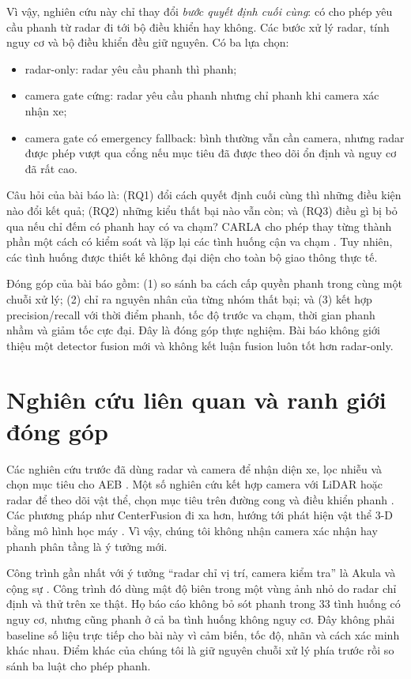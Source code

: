 \documentclass[conference]{IEEEtran}
\begin{document}
Vì vậy, nghiên cứu này chỉ thay đổi \emph{bước quyết định cuối cùng}: có cho
phép yêu cầu phanh từ radar đi tới bộ điều khiển hay không. Các bước xử lý
radar, tính nguy cơ và bộ điều khiển đều giữ nguyên. Có ba lựa chọn:

\begin{itemize}
\item radar-only: radar yêu cầu phanh thì phanh;
\item camera gate cứng: radar yêu cầu phanh nhưng chỉ phanh khi camera xác nhận
xe;
\item camera gate có emergency fallback: bình thường vẫn cần camera, nhưng
radar được phép vượt qua cổng nếu mục tiêu đã được theo dõi ổn định và nguy cơ
đã rất cao.
\end{itemize}

Câu hỏi của bài báo là: (RQ1) đổi cách quyết định cuối cùng thì những điều kiện
nào đổi kết quả; (RQ2) những kiểu thất bại nào vẫn còn; và (RQ3) điều gì bị bỏ
qua nếu chỉ đếm có phanh hay có va chạm? CARLA cho phép thay từng thành phần
một cách có kiểm soát và lặp lại các tình huống cận va chạm
\cite{dosovitskiy2017carla,kang2019testing}. Tuy nhiên, các tình huống được
thiết kế không đại diện cho toàn bộ giao thông thực tế.

Đóng góp của bài báo gồm: (1) so sánh ba cách cấp quyền phanh trong cùng một
chuỗi xử lý; (2) chỉ ra nguyên nhân của từng nhóm thất bại; và (3) kết hợp
precision/recall với thời điểm phanh, tốc độ trước va chạm, thời gian phanh
nhầm và giảm tốc cực đại. Đây là đóng góp thực nghiệm. Bài báo không giới thiệu
một detector fusion mới và không kết luận fusion luôn tốt hơn radar-only.

\section{Nghiên cứu liên quan và ranh giới đóng góp}
Các nghiên cứu trước đã dùng radar và camera để nhận diện xe, lọc nhiễu và
chọn mục tiêu cho AEB \cite{kim2013vehicle,hsu2015noise}. Một số nghiên cứu
kết hợp camera với LiDAR hoặc radar để theo dõi vật thể, chọn mục tiêu trên
đường cong và điều khiển phanh \cite{bae2021cipv,zhang2023curved}. Các phương
pháp như CenterFusion đi xa hơn, hướng tới phát hiện vật thể 3-D bằng mô hình
học máy \cite{nabati2021centerfusion}. Vì vậy, chúng tôi không nhận camera
xác nhận hay phanh phân tầng là ý tưởng mới.

Công trình gần nhất với ý tưởng ``radar chỉ vị trí, camera kiểm tra'' là Akula
và cộng sự \cite{akula2026radarguided}. Công trình đó dùng mật độ biên trong
một vùng ảnh nhỏ do radar chỉ định và thử trên xe thật. Họ báo cáo không bỏ sót
phanh trong 33 tình huống có nguy cơ, nhưng cũng phanh ở cả ba tình huống không
nguy cơ. Đây không phải baseline số liệu trực tiếp cho bài này vì cảm biến,
tốc độ, nhãn và cách xác minh khác nhau. Điểm khác của chúng tôi là giữ nguyên
chuỗi xử lý phía trước rồi so sánh ba luật cho phép phanh.
\end{document}
